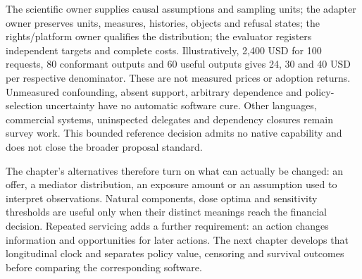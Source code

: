 The scientific owner supplies causal assumptions and sampling units; the
adapter owner preserves units, measures, histories, objects and refusal states;
the rights/platform owner qualifies the distribution; the evaluator registers
independent targets and complete costs. Illustratively, 2,400 USD for 100
requests, 80 conformant outputs and 60 useful outputs gives 24, 30 and 40 USD
per respective denominator. These are not measured prices or adoption returns.
Unmeasured confounding, absent support, arbitrary dependence and policy-selection
uncertainty have no automatic software cure. Other languages, commercial
systems, uninspected delegates and dependency closures remain survey work.
This bounded reference decision admits no native capability and does not close
the broader proposal standard.~\citep{exec24_dose_contract}


The chapter's alternatives therefore turn on what can actually be changed:
an offer, a mediator distribution, an exposure amount or an assumption used
to interpret observations. Natural components, dose optima and sensitivity
thresholds are useful only when their distinct meanings reach the financial
decision. Repeated servicing adds a further requirement: an action changes
information and opportunities for later actions. The next chapter develops
that longitudinal clock and separates policy value, censoring and survival
outcomes before comparing the corresponding software.

